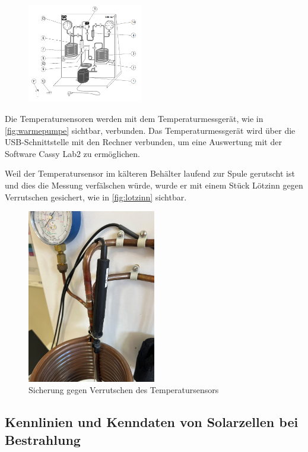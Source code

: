 \documentclass[12pt,english,ngerman]{scrartcl}
\begin{document}
\begin{figure}[H]
{		\label{fig:skizze_warmepumpe}}{
		\includegraphics[width=0.45\textwidth]{./figures/warmepumpe_skizze.PNG}
	}
\end{figure}

Die Temperatursensoren werden mit dem Temperaturmessgerät, wie in \autoref{fig:warmepumpe} sichtbar, verbunden. Das 
Temperaturmessgerät wird über die USB-Schnittstelle mit den Rechner verbunden, um eine Auswertung mit der Software 
Cassy Lab2 zu ermöglichen.

Weil der Temperatursensor im kälteren Behälter laufend zur Spule gerutscht ist und dies die Messung verfälschen würde,
wurde er mit einem Stück Lötzinn gegen Verrutschen gesichert, wie in \autoref{fig:lotzinn} sichtbar.

\begin{figure}[H]
	\begin{center}
		\includegraphics[width =0.5\textwidth]{./figures/lotzinn.png}
	\end{center}
	\caption{Sicherung gegen Verrutschen des Temperatursensors
	}\label{fig:lotzinn}
\end{figure}

\subsection{Kennlinien und Kenndaten von Solarzellen bei Bestrahlung}
\end{document}
